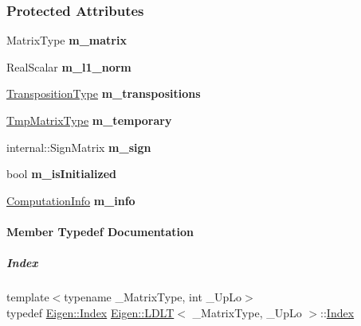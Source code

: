 \subsubsection*{Protected Attributes}
\begin{DoxyCompactItemize}
\item 
\mbox{\label{group___cholesky___module_a153948da33949f4563c05c07d57c18eb}} 
Matrix\+Type {\bfseries m\+\_\+matrix}
\item 
\mbox{\label{group___cholesky___module_a84fdac857f2dfc074484656a228936bb}} 
Real\+Scalar {\bfseries m\+\_\+l1\+\_\+norm}
\item 
\mbox{\label{group___cholesky___module_a04f7ed53ae4862aedd1060a768e36ce3}} 
\hyperlink{group___core___module}{Transposition\+Type} {\bfseries m\+\_\+transpositions}
\item 
\mbox{\label{group___cholesky___module_ad48da194d7275c2d046362ee3bf67bf4}} 
\hyperlink{group___core___module}{Tmp\+Matrix\+Type} {\bfseries m\+\_\+temporary}
\item 
\mbox{\label{group___cholesky___module_a2fded8bbfe0effc0456ab309543a632a}} 
internal\+::\+Sign\+Matrix {\bfseries m\+\_\+sign}
\item 
\mbox{\label{group___cholesky___module_aef70622f08af966e5f263464c1f1d4f7}} 
bool {\bfseries m\+\_\+is\+Initialized}
\item 
\mbox{\label{group___cholesky___module_a317b4095fbf24f0fb83476980aa758df}} 
\hyperlink{group__enums_ga85fad7b87587764e5cf6b513a9e0ee5e}{Computation\+Info} {\bfseries m\+\_\+info}
\end{DoxyCompactItemize}


\paragraph{Member Typedef Documentation}
\mbox{\label{group___cholesky___module_ad9c57eb2fb3bbccd51b9d2e111bea355}} 
\subparagraph{\texorpdfstring{Index}{Index}\hspace{0.1cm}{\footnotesize\ttfamily [1/2]}}
{\footnotesize\ttfamily template$<$typename \+\_\+\+Matrix\+Type, int \+\_\+\+Up\+Lo$>$ \\
typedef \hyperlink{namespace_eigen_a62e77e0933482dafde8fe197d9a2cfde}{Eigen\+::\+Index} \hyperlink{group___cholesky___module_class_eigen_1_1_l_d_l_t}{Eigen\+::\+L\+D\+LT}$<$ \+\_\+\+Matrix\+Type, \+\_\+\+Up\+Lo $>$\+::\hyperlink{group___cholesky___module_ad9c57eb2fb3bbccd51b9d2e111bea355}{Index}}

